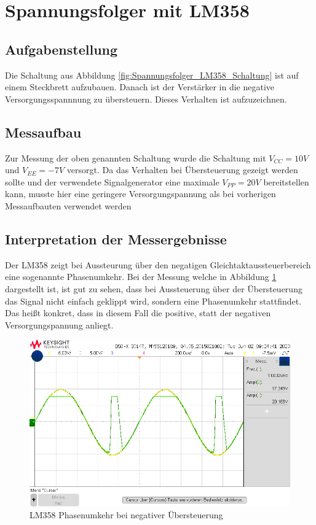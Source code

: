 \section{Spannungsfolger mit LM358}
\subsection{Aufgabenstellung}
Die Schaltung aus Abbildung \ref{fig:Spannungsfolger_LM358_Schaltung} ist auf einem Steckbrett aufzubauen. Danach ist der Verstärker in die negative Versorgungsspannnung zu übersteuern. Dieses Verhalten ist aufzuzeichnen. 

\subsection{Messaufbau}
Zur Messung der oben genannten Schaltung wurde die Schaltung mit $V_{CC} = 10V$ und $V_{EE} = -7V$ versorgt. Da das Verhalten bei Übersteuerung gezeigt werden sollte und der verwendete Signalgenerator eine maximale $V_{PP} = 20V$ bereitstellen kann, musste hier eine geringere Versorgungspannung als bei vorherigen Messaufbauten verwendet werden

\subsection{Interpretation der Messergebnisse}
Der LM358 zeigt bei Aussteurung über den negatigen Gleichtaktaussteuerbereich eine sogenannte Phasenumkehr. Bei der Messung welche in Abbildung \ref{fig:LM358_Phasenumkehr} dargestellt ist, ist gut zu sehen, dass bei Aussteuerung über der Übersteuerung das Signal nicht einfach geklippt wird, sondern eine Phasenumkehr stattfindet. Das heißt konkret, dass in diesem Fall die positive, statt der negativen Versorgungspannung anliegt. 
\begin{figure}[H]
    \centering
    \includegraphics[width = \costumPicWidth]{Lab_2/Messungen/Follower/scope_35.png}
    \caption{LM358 Phasenumkehr bei negativer Übersteuerung}
    \label{fig:LM358_Phasenumkehr}
\end{figure}

